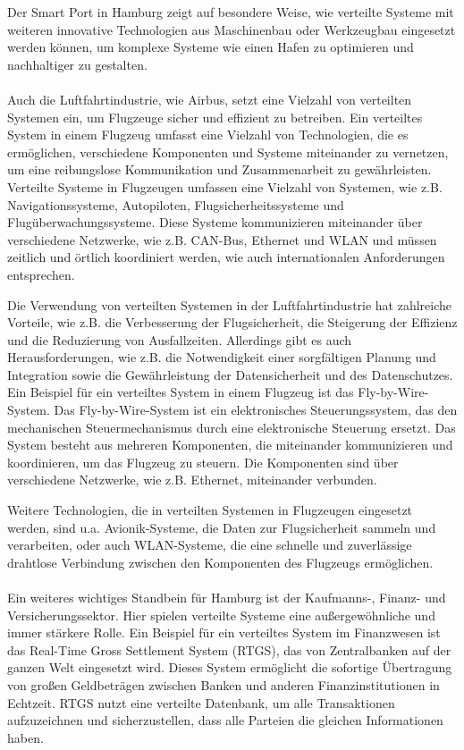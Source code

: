 Der Smart Port in Hamburg zeigt auf besondere Weise, wie verteilte Systeme mit weiteren innovative Technologien aus Maschinenbau oder Werkzeugbau  eingesetzt werden können\cite{Bockenfeld2020}, um komplexe Systeme wie einen Hafen zu optimieren und nachhaltiger zu gestalten.
\\\\
Auch die Luftfahrtindustrie, wie Airbus, setzt eine Vielzahl von verteilten Systemen ein, um Flugzeuge sicher und effizient zu betreiben. Ein verteiltes System in einem Flugzeug umfasst eine Vielzahl von Technologien, die es ermöglichen, verschiedene Komponenten und Systeme miteinander zu vernetzen, um eine reibungslose Kommunikation und Zusammenarbeit zu gewährleisten\cite{chen2017distributed}. Verteilte Systeme in Flugzeugen umfassen eine Vielzahl von Systemen, wie z.B. Navigationssysteme, Autopiloten, Flugsicherheitssysteme und Flugüberwachungssysteme. Diese Systeme kommunizieren miteinander über verschiedene Netzwerke, wie z.B. CAN-Bus, Ethernet und WLAN und müssen zeitlich und örtlich koordiniert werden, wie auch internationalen Anforderungen entsprechen.

Die Verwendung von verteilten Systemen in der Luftfahrtindustrie hat zahlreiche Vorteile, wie z.B. die Verbesserung der Flugsicherheit, die Steigerung der Effizienz und die Reduzierung von Ausfallzeiten. Allerdings gibt es auch Herausforderungen, wie z.B. die Notwendigkeit einer sorgfältigen Planung und Integration sowie die Gewährleistung der Datensicherheit und des Datenschutzes. Ein Beispiel für ein verteiltes System in einem Flugzeug ist das Fly-by-Wire-System. Das Fly-by-Wire-System ist ein elektronisches Steuerungssystem, das den mechanischen Steuermechanismus durch eine elektronische Steuerung ersetzt\cite{tian2017fault}. Das System besteht aus mehreren Komponenten, die miteinander kommunizieren und koordinieren, um das Flugzeug zu steuern. Die Komponenten sind über verschiedene Netzwerke, wie z.B. Ethernet\cite{wang2018architecture}, miteinander verbunden.

Weitere Technologien, die in verteilten Systemen in Flugzeugen eingesetzt werden, sind u.a. Avionik-Systeme, die Daten zur Flugsicherheit sammeln und verarbeiten, oder auch WLAN-Systeme, die eine schnelle und zuverlässige drahtlose Verbindung zwischen den Komponenten des Flugzeugs ermöglichen.
\\\\
Ein weiteres wichtiges Standbein für Hamburg ist der Kaufmanns-, Finanz- und Versicherungssektor. Hier spielen verteilte Systeme eine außergewöhnliche und immer stärkere Rolle. Ein Beispiel für ein verteiltes System im Finanzwesen ist das Real-Time Gross Settlement System (RTGS)\cite{rtgs}, das von Zentralbanken auf der ganzen Welt eingesetzt wird. Dieses System ermöglicht die sofortige Übertragung von großen Geldbeträgen zwischen Banken und anderen Finanzinstitutionen in Echtzeit. RTGS nutzt eine verteilte Datenbank, um alle Transaktionen aufzuzeichnen und sicherzustellen, dass alle Parteien die gleichen Informationen haben.

